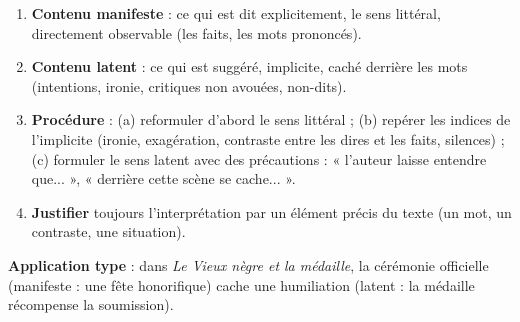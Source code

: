 \documentclass[11pt]{article}
\newcommand{\cle}[1]{{\popxbold\color{popdark}#1}}
\begin{document}
\begin{methode}
\begin{enumerate}
\item \textbf{\cle{Contenu manifeste}} : ce qui est dit explicitement, le sens littéral, directement observable (les faits, les mots prononcés).
\item \textbf{\cle{Contenu latent}} : ce qui est suggéré, implicite, caché derrière les mots (intentions, ironie, critiques non avouées, non-dits).
\item \textbf{Procédure} : (a) reformuler d'abord le sens littéral ; (b) repérer les indices de l'implicite (ironie, exagération, contraste entre les dires et les faits, silences) ; (c) formuler le sens latent avec des précautions : « l'auteur laisse entendre que... », « derrière cette scène se cache... ».
\item \textbf{Justifier} toujours l'interprétation par un élément précis du texte (un mot, un contraste, une situation).
\end{enumerate}
\textbf{Application type} : dans \emph{Le Vieux nègre et la médaille}, la cérémonie officielle (manifeste : une fête honorifique) cache une humiliation (latent : la médaille récompense la soumission).
\end{methode}
\end{document}
